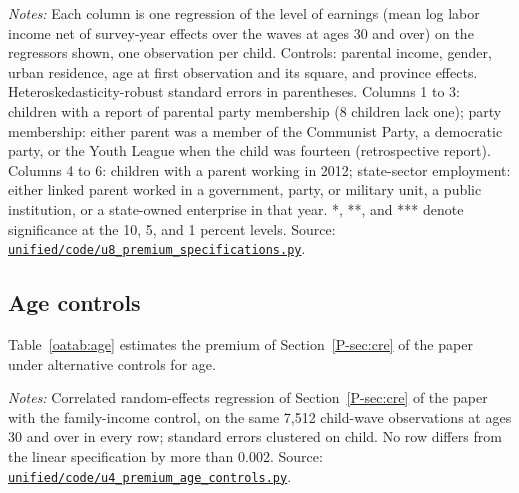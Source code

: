 \documentclass[11pt]{article}
\numberwithin{equation}{section}
\newcommand{\repourl}{https://github.com/JiachenJin1001/before-the-labor-market-or-inside-it}
\newcommand{\code}[1]{\href{\repourl/blob/main/#1}{\nolinkurl{#1}}}
\begin{document}
\begin{table}[H]
\centering
\small
\caption{Party membership and state-sector employment as competing markers.}
\label{oatab:markers}

\par\smallskip
\begin{minipage}{0.92\textwidth}
\footnotesize\emph{Notes:} Each column is one regression of the level of earnings (mean log labor income net of survey-year effects over the waves at ages 30 and over) on the regressors shown, one observation per child. Controls: parental income, gender, urban residence, age at first observation and its square, and province effects. Heteroskedasticity-robust standard errors in parentheses. Columns 1 to 3: children with a report of parental party membership (8 children lack one); party membership: either parent was a member of the Communist Party, a democratic party, or the Youth League when the child was fourteen (retrospective report). Columns 4 to 6: children with a parent working in 2012; state-sector employment: either linked parent worked in a government, party, or military unit, a public institution, or a state-owned enterprise in that year. *, **, and *** denote significance at the 10, 5, and 1 percent levels. Source: \code{unified/code/u8_premium_specifications.py}.
\end{minipage}
\end{table}

\subsection{Age controls}

Table~\ref{oatab:age} estimates the premium of Section~\ref{P-sec:cre} of the paper under alternative controls for age.

\begin{table}[H]
\centering
\small
\caption{The premium under alternative age controls.}
\label{oatab:age}

\par\smallskip
\begin{minipage}{0.9\textwidth}
\footnotesize\emph{Notes:} Correlated random-effects regression of
Section~\ref{P-sec:cre} of the paper with the family-income control, on
the same 7,512 child-wave observations at ages 30 and over in
every row; standard errors clustered on child. No row differs from the
linear specification by more than 0.002. Source:
\code{unified/code/u4_premium_age_controls.py}.
\end{minipage}
\end{table}
\end{document}
